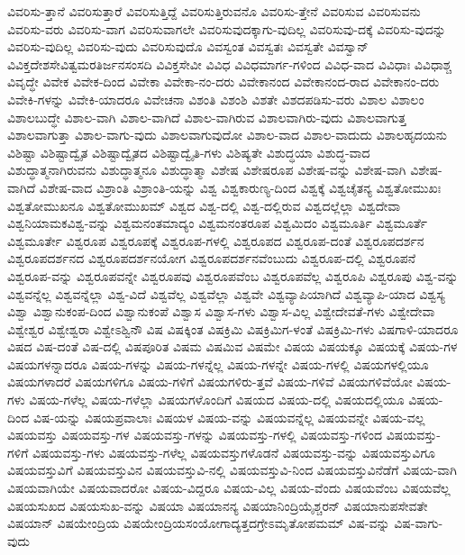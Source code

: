 {ವಿವರಿಸು-ತ್ತಾನೆ
ವಿವರಿಸುತ್ತಾರೆ
ವಿವರಿಸುತ್ತಿದ್ದೆ
ವಿವರಿಸುತ್ತಿರುವನೊ
ವಿವರಿಸು-ತ್ತೇನೆ
ವಿವರಿಸುವ
ವಿವರಿಸುವನು
ವಿವರಿಸು-ವರು
ವಿವರಿಸು-ವಾಗ
ವಿವರಿಸುವಾಗಲೇ
ವಿವರಿಸುವುದಕ್ಕಾಗು-ವುದಿಲ್ಲ
ವಿವರಿಸುವು-ದಕ್ಕೆ
ವಿವರಿಸು-ವುದನ್ನು
ವಿವರಿಸು-ವುದಿಲ್ಲ
ವಿವರಿಸು-ವುದು
ವಿವರಿಸುವುದೊ
ವಿವಸ್ವಂತ
ವಿವಸ್ವತಃ
ವಿವಸ್ವತೇ
ವಿವಸ್ವಾನ್
ವಿವಿಕ್ತದೇಶಸೇವಿತ್ವಮರತಿರ್ಜನಸಂಸದಿ
ವಿವಿಕ್ತಸೇವೀ
ವಿವಿಧ
ವಿವಿಧಮಾರ್ಗ-ಗಳಿಂದ
ವಿವಿಧ-ವಾದ
ವಿವಿಧಾಃ
ವಿವಿಧಾಶ್ಚ
ವಿವೃದ್ಧೇ
ವಿವೇಕ
ವಿವೇಕ-ದಿಂದ
ವಿವೇಕಾ
ವಿವೇಕಾ-ನಂ-ದರು
ವಿವೇಕಾನಂದ
ವಿವೇಕಾನಂದ-ರಾದ
ವಿವೇಕಾನಂ-ದರು
ವಿವೇಕಿ-ಗಳನ್ನು
ವಿವೇಕಿ-ಯಾದರೂ
ವಿವೇಚನಾ
ವಿಶಂತಿ
ವಿಶಂಶಿ
ವಿಶತೇ
ವಿಶದಪಡಿಸು-ವರು
ವಿಶಾಲ
ವಿಶಾಲಂ
ವಿಶಾಲಬುದ್ಧೇ
ವಿಶಾಲ-ವಾಗಿ
ವಿಶಾಲ-ವಾಗಿದೆ
ವಿಶಾಲ-ವಾಗಿರುವ
ವಿಶಾಲವಾಗಿರು-ವುದು
ವಿಶಾಲವಾಗುತ್ತ
ವಿಶಾಲವಾಗುತ್ತಾ
ವಿಶಾಲ-ವಾಗು-ವುದು
ವಿಶಾಲವಾಗುವುದೋ
ವಿಶಾಲ-ವಾದ
ವಿಶಾಲ-ವಾದುದು
ವಿಶಾಲಹೃದಯನು
ವಿಶಿಷ್ಟಾ
ವಿಶಿಷ್ಟಾದ್ವೈತ
ವಿಶಿಷ್ಟಾದ್ವೈತದ
ವಿಶಿಷ್ಟಾದ್ವೈತಿ-ಗಳು
ವಿಶಿಷ್ಯತೇ
ವಿಶುದ್ಧಯಾ
ವಿಶುದ್ಧ-ವಾದ
ವಿಶುದ್ಧಾತ್ಮನಾಗಿರುವನು
ವಿಶುದ್ಧಾತ್ಮನೂ
ವಿಶುದ್ಧಾತ್ಮಾ
ವಿಶೇಷ
ವಿಶೇಷರೂಪ
ವಿಶೇಷ-ವನ್ನು
ವಿಶೇಷ-ವಾಗಿ
ವಿಶೇಷ-ವಾಗಿದೆ
ವಿಶೇಷ-ವಾದ
ವಿಶ್ರಾಂತಿ
ವಿಶ್ರಾಂತಿ-ಯನ್ನು
ವಿಶ್ವ
ವಿಶ್ವಕಾರುಣ್ಯ-ದಿಂದ
ವಿಶ್ವಕ್ಕೆ
ವಿಶ್ವಚೈತನ್ಯ
ವಿಶ್ವತೋಮುಖಃ
ವಿಶ್ವತೋಮುಖನೂ
ವಿಶ್ವತೋಮುಖಮ್
ವಿಶ್ವದ
ವಿಶ್ವ-ದಲ್ಲಿ
ವಿಶ್ವ-ದಲ್ಲಿರುವ
ವಿಶ್ವದಲ್ಲೆಲ್ಲಾ
ವಿಶ್ವದೇವಾ
ವಿಶ್ವನಿಯಾಮಕವಿಶ್ವ-ವನ್ನು
ವಿಶ್ವಮನಂತಮಾದ್ಯಂ
ವಿಶ್ವಮನಂತರೂಪ
ವಿಶ್ವಮಿದಂ
ವಿಶ್ವಮೂರ್ತಿ
ವಿಶ್ವಮೂರ್ತೆ
ವಿಶ್ವಮೂರ್ತೇ
ವಿಶ್ವರೂಪ
ವಿಶ್ವರೂಪಕ್ಕೆ
ವಿಶ್ವರೂಪ-ಗಳಲ್ಲಿ
ವಿಶ್ವರೂಪದ
ವಿಶ್ವರೂಪ-ದಂತೆ
ವಿಶ್ವರೂಪದರ್ಶನ
ವಿಶ್ವರೂಪದರ್ಶನದ
ವಿಶ್ವರೂಪದರ್ಶನಯೋಗ
ವಿಶ್ವರೂಪದರ್ಶನವೆಂಬುದು
ವಿಶ್ವರೂಪ-ದಲ್ಲಿ
ವಿಶ್ವರೂಪನೆ
ವಿಶ್ವರೂಪ-ವನ್ನು
ವಿಶ್ವರೂಪವನ್ನೇ
ವಿಶ್ವರೂಪವು
ವಿಶ್ವರೂಪವೆಂಬ
ವಿಶ್ವರೂಪವೆಲ್ಲ
ವಿಶ್ವರೂಪಿ
ವಿಶ್ವರೂಪು
ವಿಶ್ವ-ವನ್ನು
ವಿಶ್ವವನ್ನೆಲ್ಲ
ವಿಶ್ವವನ್ನೆಲ್ಲಾ
ವಿಶ್ವ-ವಿದೆ
ವಿಶ್ವವೆಲ್ಲ
ವಿಶ್ವವೆಲ್ಲಾ
ವಿಶ್ವವೇ
ವಿಶ್ವವ್ಯಾಪಿಯಾಗಿದೆ
ವಿಶ್ವವ್ಯಾಪಿ-ಯಾದ
ವಿಶ್ವಸ್ಯ
ವಿಶ್ವಾ
ವಿಶ್ವಾನುಕಂಪ-ದಿಂದ
ವಿಶ್ವಾನುಕಂಪೆ
ವಿಶ್ವಾಸ
ವಿಶ್ವಾಸ-ಗಳು
ವಿಶ್ವಾಸ-ವಿಲ್ಲ
ವಿಶ್ವೇದೇವತೆ-ಗಳು
ವಿಶ್ವೇದೇವಾ
ವಿಶ್ವೇಶ್ವರ
ವಿಶ್ವೇಶ್ವರಾ
ವಿಶ್ವೇಽಶ್ವಿನೌ
ವಿಷ
ವಿಷಕ್ಕಿಂತ
ವಿಷಕ್ರಿಮಿ
ವಿಷಕ್ರಿಮಿಗ-ಳಂತೆ
ವಿಷಕ್ರಿಮಿ-ಗಳು
ವಿಷಗಾಳಿ-ಯಾದರೂ
ವಿಷದ
ವಿಷ-ದಂತೆ
ವಿಷ-ದಲ್ಲಿ
ವಿಷಪೂರಿತ
ವಿಷಮ
ವಿಷಮಿವ
ವಿಷಮೇ
ವಿಷಯ
ವಿಷಯಕ್ಕೂ
ವಿಷಯಕ್ಕೆ
ವಿಷಯ-ಗಳ
ವಿಷಯಗಳನ್ನಾದರೂ
ವಿಷಯ-ಗಳನ್ನು
ವಿಷಯ-ಗಳನ್ನೆಲ್ಲ
ವಿಷಯ-ಗಳನ್ನೇ
ವಿಷಯ-ಗಳಲ್ಲಿ
ವಿಷಯಗಳಲ್ಲಿಯೂ
ವಿಷಯಗಳಾದರೆ
ವಿಷಯಗಳಿಗೂ
ವಿಷಯ-ಗಳಿಗೆ
ವಿಷಯಗಳಿರು-ತ್ತವೆ
ವಿಷಯ-ಗಳಿವೆ
ವಿಷಯಗಳಿವೆಯೋ
ವಿಷಯ-ಗಳು
ವಿಷಯ-ಗಳೆಲ್ಲ
ವಿಷಯ-ಗಳೆಲ್ಲಾ
ವಿಷಯಗಳೊಂದಿಗೆ
ವಿಷಯದ
ವಿಷಯ-ದಲ್ಲಿ
ವಿಷಯದಲ್ಲಿಯೂ
ವಿಷಯ-ದಿಂದ
ವಿಷ-ಯನ್ನು
ವಿಷಯಪ್ರವಾಲಾಃ
ವಿಷಯಳ
ವಿಷಯ-ವನ್ನು
ವಿಷಯವನ್ನೆಲ್ಲ
ವಿಷಯವನ್ನೇ
ವಿಷಯ-ವಲ್ಲ
ವಿಷಯವಸ್ತು
ವಿಷಯವಸ್ತು-ಗಳ
ವಿಷಯವಸ್ತು-ಗಳನ್ನು
ವಿಷಯವಸ್ತು-ಗಳಲ್ಲಿ
ವಿಷಯವಸ್ತು-ಗಳಿಂದ
ವಿಷಯವಸ್ತು-ಗಳಿಗೆ
ವಿಷಯವಸ್ತು-ಗಳು
ವಿಷಯವಸ್ತು-ಗಳೆಲ್ಲ
ವಿಷಯವಸ್ತುಗಳೊಡನೆ
ವಿಷಯವಸ್ತು-ವನ್ನು
ವಿಷಯವಸ್ತುವಿಗೂ
ವಿಷಯವಸ್ತುವಿಗೆ
ವಿಷಯವಸ್ತುವಿನ
ವಿಷಯವಸ್ತುವಿ-ನಲ್ಲಿ
ವಿಷಯವಸ್ತುವಿ-ನಿಂದ
ವಿಷಯವಸ್ತುವಿನೆಡೆಗೆ
ವಿಷಯ-ವಾಗಿ
ವಿಷಯವಾಗಿಯೇ
ವಿಷಯವಾದರೋ
ವಿಷಯ-ವಿದ್ದರೂ
ವಿಷಯ-ವಿಲ್ಲ
ವಿಷಯ-ವೆಂದು
ವಿಷಯವೆಂಬ
ವಿಷಯವೆಲ್ಲ
ವಿಷಯಸುಖದ
ವಿಷಯಸುಖ-ವನ್ನು
ವಿಷಯಾ
ವಿಷಯಾನನ್ಯ
ವಿಷಯಾನಿಂದ್ರಿಯೈಶ್ಚರನ್
ವಿಷಯಾನುಪಸೇವತೇ
ವಿಷಯಾನ್
ವಿಷಯೇಂದ್ರಿಯ
ವಿಷಯೇಂದ್ರಿಯಸಂಯೋಗಾದ್ಯತ್ತದಗ್ರೇಽಮೃತೋಪಮಮ್
ವಿಷ-ವನ್ನು
ವಿಷ-ವಾಗು-ವುದು
}
